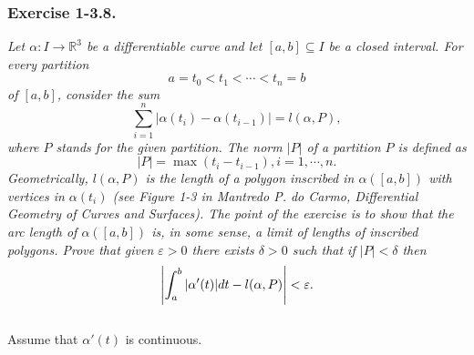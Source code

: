 \documentclass{article}
\begin{document}
\subsubsection*{Exercise 1-3.8.}
\emph{Let $\alpha: I \to \mathbb{R}^3$ be a differentiable curve and
let $[a,b] \subseteq I$ be a closed interval.
For every partition
\[
  a = t_0 < t_1 < \cdots < t_n = b
\]
of $[a,b]$, consider the sum
\[
  \sum_{i=1}^{n} |\alpha(t_i) - \alpha(t_{i-1})| = l(\alpha,P),
\]
where $P$ stands for the given partition.
The norm $|P|$ of a partition $P$ is defined as
\[
  |P| = \max(t_i - t_{i-1}), i = 1, \cdots, n.
\]
Geometrically, $l(\alpha,P)$ is the length of a polygon inscribed in $\alpha([a,b])$
with vertices in $\alpha(t_i)$
(see Figure 1-3 in Mantredo P. do Carmo, Differential Geometry of Curves and Surfaces).
The point of the exercise is to show that the arc length of $\alpha([a,b])$ is,
in some sense, a limit of lengths of inscribed polygons.
Prove that given $\varepsilon > 0$ there exists $\delta > 0$ such that
if $|P| < \delta$ then
\[
  \abs{ \int_{a}^{b} |\alpha'(t)|dt - l(\alpha,P) } < \varepsilon.
\]} \\

Assume that $\alpha'(t)$ is continuous. \\
\end{document}
